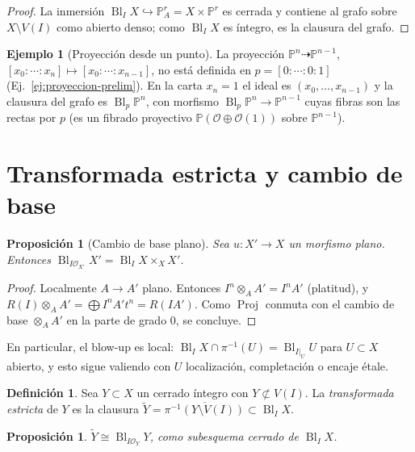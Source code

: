 \documentclass[11pt,a4paper,oneside]{book}
\newcommand{\Proj}{\operatorname{Proj}}
\newcommand{\Bl}{\operatorname{Bl}}
\newcommand{\PP}{\mathbb{P}}
\newcommand{\cO}{\mathcal{O}}
\theoremstyle{plain}
\newtheorem{proposicion}[teorema]{Proposición}
\theoremstyle{definition}
\newtheorem{definicion}[teorema]{Definición}
\newtheorem{ejemplo}[teorema]{Ejemplo}
\theoremstyle{remark}
\begin{document}
\begin{proof}
La inmersión $\Bl_IX\hookrightarrow\PP^r_A=X\times\PP^r$ es cerrada y contiene al grafo sobre $X\setminus V(I)$ como abierto denso; como $\Bl_IX$ es íntegro, es la clausura del grafo.
\end{proof}

\begin{ejemplo}[Proyección desde un punto]\label{ej:proyeccion}
La proyección $\PP^n\dashrightarrow\PP^{n-1}$, $[x_0:\cdots:x_n]\mapsto[x_0:\cdots:x_{n-1}]$, no está definida en $p=[0:\cdots:0:1]$ (Ej.~\ref{ej:proyeccion-prelim}). En la carta $x_n=1$ el ideal es $(x_0,\dots,x_{n-1})$ y la clausura del grafo es $\Bl_p\PP^n$, con morfismo $\Bl_p\PP^n\to\PP^{n-1}$ cuyas fibras son las rectas por $p$ (es un fibrado proyectivo $\PP(\cO\oplus\cO(1))$ sobre $\PP^{n-1}$).
\end{ejemplo}

\section{Transformada estricta y cambio de base}

\begin{proposicion}[Cambio de base plano]\label{prop:planobase}
Sea $u:X'\to X$ un morfismo plano. Entonces $\Bl_{I\cO_{X'}}X'=\Bl_IX\times_XX'$.
\end{proposicion}

\begin{proof}
Localmente $A\to A'$ plano. Entonces $I^n\otimes_AA'=I^nA'$ (platitud), y $R(I)\otimes_AA'=\bigoplus I^nA' t^n=R(IA')$. Como $\Proj$ conmuta con el cambio de base $\otimes_AA'$ en la parte de grado $0$, se concluye.
\end{proof}

En particular, el blow-up es local: $\Bl_IX\cap\pi^{-1}(U)=\Bl_{I|_U}U$ para $U\subset X$ abierto, y esto sigue valiendo con $U$ localización, completación o encaje étale.

\begin{definicion}
Sea $Y\subset X$ un cerrado íntegro con $Y\not\subset V(I)$. La \emph{transformada estricta} de $Y$ es la clausura $\tilde Y=\overline{\pi^{-1}(Y\setminus V(I))}\subset\Bl_IX$.
\end{definicion}

\begin{proposicion}\label{prop:estricta}
$\tilde Y\cong\Bl_{I\cO_Y}Y$, como subesquema cerrado de $\Bl_IX$.
\end{proposicion}
\end{document}
